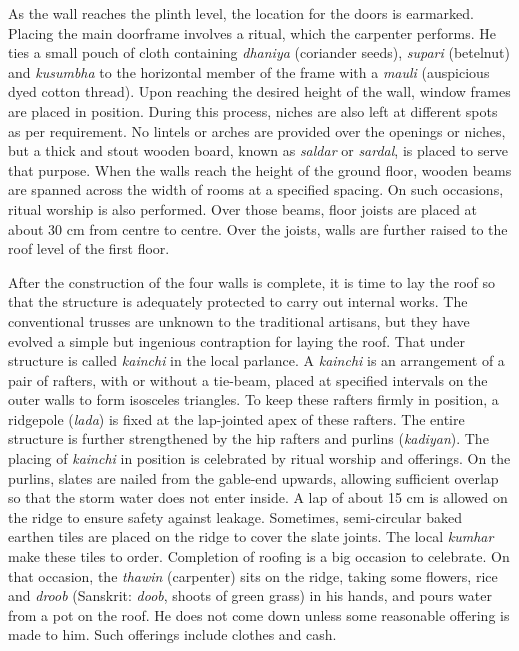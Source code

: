 As the wall reaches the plinth level, the location for the doors is earmarked. Placing the main doorframe involves a ritual, which the carpenter performs. He ties a small pouch of cloth containing \textit{dhaniya} (coriander seeds), \textit{supari} (betelnut) and \textit{kusumbha} to the horizontal member of the frame with a \textit{mauli} (auspicious dyed cotton thread). Upon reaching the desired height of the wall, window frames are placed in position. During this process, niches are also left at different spots as per requirement. No lintels or arches are provided over the openings or niches, but a thick and stout wooden board, known as \textit{saldar} or \textit{sardal}, is placed to serve that purpose. When the walls reach the height of the ground floor, wooden beams are spanned across the width of rooms at a specified spacing. On such occasions, ritual worship is also performed. Over those beams, floor joists are placed at about 30 cm from centre to centre. Over the joists, walls are further raised to the roof level of the first floor.

After the construction of the four walls is complete, it is time to lay the roof so that the structure is adequately protected to carry out internal works. The conventional trusses are unknown to the traditional artisans, but they have evolved a simple but ingenious contraption for laying the roof. That under structure is called \textit{kainchi} in the local parlance. A \textit{kainchi} is an arrangement of a pair of rafters, with or without a tie-beam, placed at specified intervals on the outer walls to form isosceles triangles. To keep these rafters firmly in position, a ridgepole (\textit{lada}) is fixed at the lap-jointed apex of these rafters. The entire structure is further strengthened by the hip rafters and purlins (\textit{kadiyan}). The placing of \textit{kainchi} in position is celebrated by ritual worship and offerings. On the purlins, slates are nailed from the gable-end upwards, allowing sufficient overlap so that the storm water does not enter inside. A lap of about 15 cm is allowed on the ridge to ensure safety against leakage. Sometimes, semi-circular baked earthen tiles are placed on the ridge to cover the slate joints. The local \textit{kumhar} make these tiles to order. Completion of roofing is a big occasion to celebrate. On that occasion, the \textit{thawin} (carpenter) sits on the ridge, taking some flowers, rice and \textit{droob} (Sanskrit: \textit{doob}, shoots of green grass) in his hands, and pours water from a pot on the roof. He does not come down unless some reasonable offering is made to him. Such offerings include clothes and cash.

